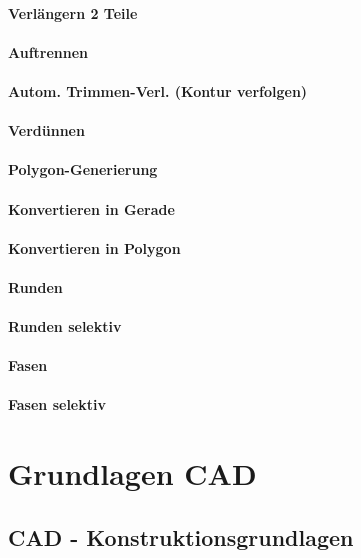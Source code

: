 \documentclass[a5paper]{book}
\begin{document}
			\subsubsection{Verlängern 2 Teile} 
			\subsubsection{Auftrennen} 
			\subsubsection{Autom. Trimmen-Verl. (Kontur verfolgen)} 
			\subsubsection{Verdünnen} 
			\subsubsection{Polygon-Generierung} 
			\subsubsection{Konvertieren in Gerade} 
			\subsubsection{Konvertieren in Polygon}
			\subsubsection{Runden} 
			\subsubsection{Runden selektiv} 
			\subsubsection{Fasen} 
			\subsubsection{Fasen selektiv} 
						
\chapter{Grundlagen CAD}
	\section{CAD - Konstruktionsgrundlagen}
\end{document}
